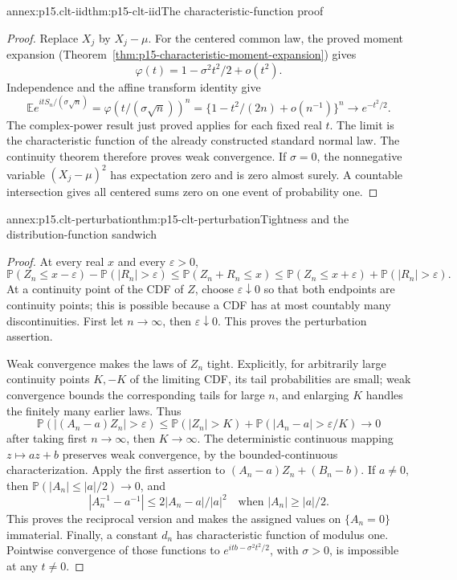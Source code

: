 \begin{annexitem}{annex:p15.clt-iid}{thm:p15-clt-iid}{The characteristic-function proof}
\begin{proof}
Replace \(X_j\) by \(X_j-\mu\). For the centered common law,
the proved moment expansion
(Theorem~\ref{thm:p15-characteristic-moment-expansion}) gives
\[
 \varphi(t)=1-\sigma^2t^2/2+o(t^2).
 \]
Independence and the affine transform identity give
\[
 \mathbb Ee^{itS_n/(\sigma\sqrt n)}
 =\varphi(t/(\sigma\sqrt n))^n
 =\{1-t^2/(2n)+o(n^{-1})\}^n
 \longrightarrow e^{-t^2/2}.
 \]
The complex-power result just proved applies for each fixed real \(t\).
The limit is the characteristic function of the already constructed
standard normal law. The continuity theorem therefore proves weak
convergence. If \(\sigma=0\), the nonnegative variable
\((X_j-\mu)^2\) has expectation zero and is zero almost surely.
A countable intersection gives all centered sums zero on one
event of probability one.
\end{proof}
\end{annexitem}

\begin{annexitem}{annex:p15.clt-perturbation}{thm:p15-clt-perturbation}{Tightness and the distribution-function sandwich}
\begin{proof}
At every real \(x\) and every \(\varepsilon>0\),
\[
 \mathbb P(Z_n\leq x-\varepsilon)-\mathbb P(|R_n|>\varepsilon)
 \leq\mathbb P(Z_n+R_n\leq x)
 \leq\mathbb P(Z_n\leq x+\varepsilon)
                         +\mathbb P(|R_n|>\varepsilon).
 \]
At a continuity point of the CDF of \(Z\), choose
\(\varepsilon\downarrow0\) so that both endpoints are continuity
points; this is possible because a CDF has at most countably many
discontinuities. First let \(n\to\infty\), then
\(\varepsilon\downarrow0\). This proves the perturbation assertion.

Weak convergence makes the laws of \(Z_n\) tight. Explicitly, for
arbitrarily large continuity points \(K,-K\) of the limiting CDF,
its tail probabilities are small; weak convergence bounds the
corresponding tails for large \(n\), and enlarging \(K\) handles
the finitely many earlier laws. Thus
\[
 \mathbb P(|(A_n-a)Z_n|>\varepsilon)
 \leq\mathbb P(|Z_n|>K)+\mathbb P(|A_n-a|>\varepsilon/K)\to0
 \]
after taking first \(n\to\infty\), then \(K\to\infty\).
The deterministic continuous mapping \(z\mapsto az+b\) preserves
weak convergence, by the bounded-continuous characterization.
Apply the first assertion to
\((A_n-a)Z_n+(B_n-b)\).
If \(a\ne0\), then
\(\mathbb P(|A_n|\leq|a|/2)\to0\), and
\[
 |A_n^{-1}-a^{-1}|
 \leq2|A_n-a|/|a|^2\quad\text{when }|A_n|\geq|a|/2.
 \]
This proves the reciprocal version and makes the assigned values
on \(\{A_n=0\}\) immaterial.
Finally, a constant \(d_n\) has characteristic function of modulus
one. Pointwise convergence of those functions to
\(e^{itb-\sigma^2t^2/2}\), with \(\sigma>0\), is impossible
at any \(t\ne0\).
\end{proof}
\end{annexitem}

